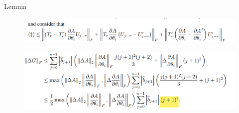 \documentclass[9pt,t,aspectratio=169]{beamer}
\begin{document}
\begin{frame}{Lemma}
\begin{figure}
    \centering
    \includegraphics[width=0.9\linewidth]{Figure/typo.PNG}
\end{figure}
\begin{figure}
    \centering
    \includegraphics[width=.9\linewidth]{Figure/ty2.PNG}
\end{figure}
\end{frame}
\end{document}

